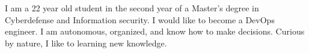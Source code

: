 
\begin{cvparagraph}
I am a 22 year old student in the second year of a Master's degree in Cyberdefense and Information security. 
I would like to become a DevOps engineer. I am autonomous, organized, and know how to make decisions. Curious by nature, I like to learning new knowledge.
\end{cvparagraph}
